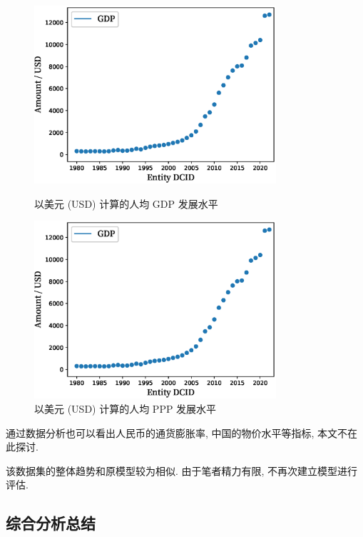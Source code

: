 \documentclass{article}
\begin{document}
\begin{figure}[H]
  \centering
  \begin{minipage}[t]{0.48\textwidth}
    \centering
    \includegraphics[width=0.8\textwidth]{figures/plot-wb-gdp.eps}
    \caption{以美元 (USD) 计算的人均 GDP 发展水平}
    \label{fig:side:g}
  \end{minipage}
  \begin{minipage}[t]{0.48\textwidth}
    \centering
    \includegraphics[width=0.8\textwidth]{figures/plot-wb-gdp.eps}
    \caption{以美元 (USD) 计算的人均 PPP 发展水平}
    \label{fig:side:h}
  \end{minipage}
\end{figure}

\par 通过数据分析也可以看出人民币的通货膨胀率, 中国的物价水平等指标, 本文不在此探讨.

该数据集的整体趋势和原模型较为相似. 由于笔者精力有限, 不再次建立模型进行评估.

\subsection{综合分析总结}
\end{document}
